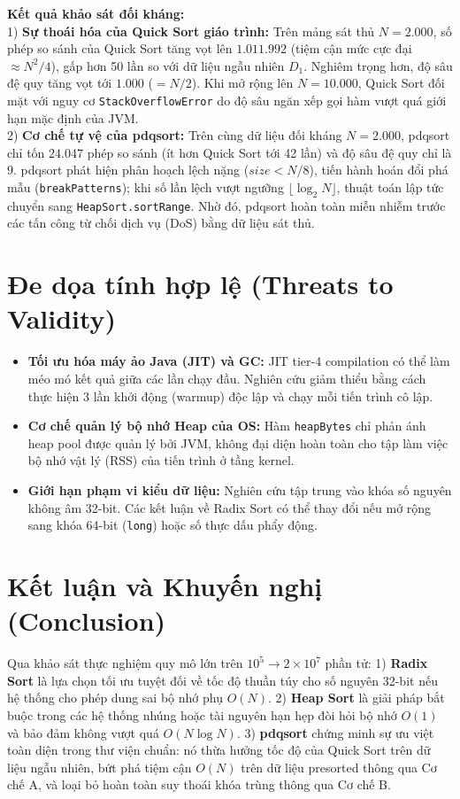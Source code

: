 \documentclass[conference]{IEEEtran}
\begin{document}
\textbf{Kết quả khảo sát đối kháng:}\\
1) \textbf{Sự thoái hóa của Quick Sort giáo trình:} Trên mảng sát thủ $N = 2.000$, số phép so sánh của Quick Sort tăng vọt lên $1.011.992$ (tiệm cận mức cực đại $\approx N^2 / 4$), gấp hơn 50 lần so với dữ liệu ngẫu nhiên $D_1$. Nghiêm trọng hơn, độ sâu đệ quy tăng vọt tới $1.000$ ($= N/2$). Khi mở rộng lên $N = 10.000$, Quick Sort đối mặt với nguy cơ \texttt{StackOverflowError} do độ sâu ngăn xếp gọi hàm vượt quá giới hạn mặc định của JVM.\\
2) \textbf{Cơ chế tự vệ của pdqsort:} Trên cùng dữ liệu đối kháng $N = 2.000$, pdqsort chỉ tốn $24.047$ phép so sánh (ít hơn Quick Sort tới 42 lần) và độ sâu đệ quy chỉ là $9$. pdqsort phát hiện phân hoạch lệch nặng ($size < N/8$), tiến hành hoán đổi phá mẫu (\texttt{breakPatterns}); khi số lần lệch vượt ngưỡng $\lfloor \log_2 N \rfloor$, thuật toán lập tức chuyển sang \texttt{HeapSort.sortRange}. Nhờ đó, pdqsort hoàn toàn miễn nhiễm trước các tấn công từ chối dịch vụ (DoS) bằng dữ liệu sát thủ.

\section{Đe dọa tính hợp lệ (Threats to Validity)}
\begin{itemize}
    \item \textbf{Tối ưu hóa máy ảo Java (JIT) và GC:} JIT tier-4 compilation có thể làm méo mó kết quả giữa các lần chạy đầu. Nghiên cứu giảm thiểu bằng cách thực hiện 3 lần khởi động (warmup) độc lập và chạy mỗi tiến trình cô lập.
    \item \textbf{Cơ chế quản lý bộ nhớ Heap của OS:} Hàm \texttt{heapBytes} chỉ phản ánh heap pool được quản lý bởi JVM, không đại diện hoàn toàn cho tập làm việc bộ nhớ vật lý (RSS) của tiến trình ở tầng kernel.
    \item \textbf{Giới hạn phạm vi kiểu dữ liệu:} Nghiên cứu tập trung vào khóa số nguyên không âm 32-bit. Các kết luận về Radix Sort có thể thay đổi nếu mở rộng sang khóa 64-bit (\texttt{long}) hoặc số thực dấu phẩy động.
\end{itemize}

\section{Kết luận và Khuyến nghị (Conclusion)}
Qua khảo sát thực nghiệm quy mô lớn trên $10^5 \to 2\times 10^7$ phần tử:
1) \textbf{Radix Sort} là lựa chọn tối ưu tuyệt đối về tốc độ thuần túy cho số nguyên 32-bit nếu hệ thống cho phép dung sai bộ nhớ phụ $O(N)$.
2) \textbf{Heap Sort} là giải pháp bắt buộc trong các hệ thống nhúng hoặc tài nguyên hạn hẹp đòi hỏi bộ nhớ $O(1)$ và bảo đảm không vượt quá $O(N \log N)$.
3) \textbf{pdqsort} chứng minh sự ưu việt toàn diện trong thư viện chuẩn: nó thừa hưởng tốc độ của Quick Sort trên dữ liệu ngẫu nhiên, bứt phá tiệm cận $O(N)$ trên dữ liệu presorted thông qua Cơ chế A, và loại bỏ hoàn toàn suy thoái khóa trùng thông qua Cơ chế B.
\end{document}
